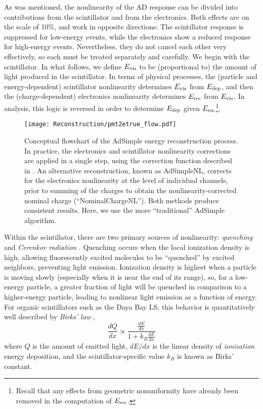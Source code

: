 \documentclass[../thesis.tex]{subfiles}
\begin{document}
As was mentioned, the nonlinearity of the AD response can be divided into contributions from the scintillator and from the electronics. Both effects are on the scale of 10\%, and work in opposite directions: The scintillator response is suppressed for low-energy events, while the electronics show a reduced response for high-energy events. Nevertheless, they do not cancel each other very effectively, so each must be treated separately and carefully. We begin with the scintillator. In what follows, we define $E_\mathrm{vis}$ to be (proportional to) the amount of light produced in the scintillator. In terms of physical processes, the (particle and energy-dependent) scintillator nonlinearity determines $E_\mathrm{vis}$ from $E_\mathrm{dep}$, and then the (charge-dependent) electronics nonlinearity determines $E_\mathrm{rec}$ from $E_\mathrm{vis}$. In analysis, this logic is reversed in order to determine $E_\mathrm{dep}$ given $E_\mathrm{rec}$\footnote{Recall that any effects from geometric nonuniformity have already been removed in the computation of $E_\mathrm{rec}$.}.

\begin{figure}[h]
  \texttt{[image: Reconstruction/pmt2etrue\_flow.pdf]}
  \caption{Conceptual flowchart of the AdSimple energy reconstruction process. In practice, the electronics and scintillator nonlinearity corrections are applied in a single step, using the correction function described in \cite{NonlinearityPaper}. An alternative reconstruction, known as AdSimpleNL, corrects for the electronics nonlinearity at the level of individual channels, prior to summing of the charges to obtain the nonlinearity-corrected nominal charge (``NominalChargeNL''). Both methods produce consistent results. Here, we use the more ``traditional'' AdSimple algorithm.}
  \label{fig:pmt2etrue}
\end{figure}

Within the scintillator, there are two primary sources of nonlinearity: \emph{quenching} \cite{Birks_1951} and \emph{Cerenkov radiation} \cite{cerenkov}. Quenching occurs when the local ionization density is high, allowing fluorescently excited molecules to be ``quenched'' by excited neighbors, preventing light emission. Ionization density is highest when a particle is moving slowly (especially when it is near the end of its range), so, for a low-energy particle, a greater fraction of light will be quenched in comparison to a higher-energy particle, leading to nonlinear light emission as a function of energy. For organic scintillators such as the Daya Bay LS, this behavior is quantitatively well described by \emph{Birks' law} \cite{Birks_1951},
\begin{equation}
  \frac{dQ}{dx} \propto \frac{\frac{dE}{dx}}{1 + k_B \frac{dE}{dx}}
  \label{eq:reconBirks}
\end{equation}
where $Q$ is the amount of emitted light, $dE/dx$ is the linear density of \emph{ionization} energy deposition, and the scintillator-specific value $k_B$ is known as Birks' constant.
\end{document}
